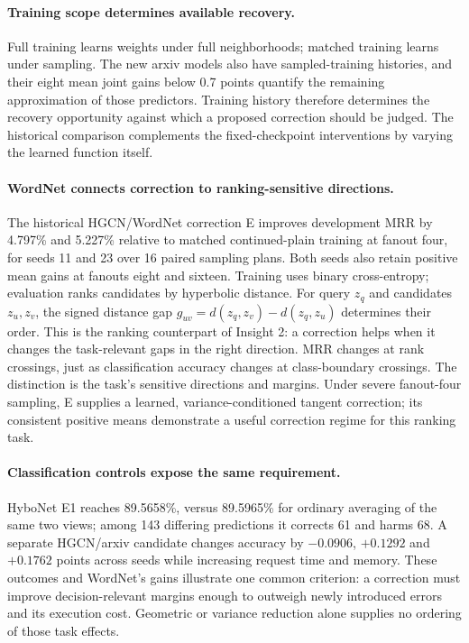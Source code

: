 \documentclass[sigconf, nonacm]{acmart}
\begin{document}
\paragraph{Training scope determines available recovery.}
Full training learns weights under full neighborhoods; matched training learns under sampling. The new arxiv models also have sampled-training histories, and their eight mean joint gains below 0.7 points quantify the remaining approximation of those predictors. Training history therefore determines the recovery opportunity against which a proposed correction should be judged. The historical comparison complements the fixed-checkpoint interventions by varying the learned function itself.

\paragraph{WordNet connects correction to ranking-sensitive directions.}
The historical HGCN/WordNet correction E improves development MRR by 4.797\% and 5.227\% relative to matched continued-plain training at fanout four, for seeds 11 and 23 over 16 paired sampling plans. Both seeds also retain positive mean gains at fanouts eight and sixteen. Training uses binary cross-entropy; evaluation ranks candidates by hyperbolic distance. For query $z_q$ and candidates $z_u,z_v$, the signed distance gap $g_{uv}=d(z_q,z_v)-d(z_q,z_u)$ determines their order. This is the ranking counterpart of Insight 2: a correction helps when it changes the task-relevant gaps in the right direction. MRR changes at rank crossings, just as classification accuracy changes at class-boundary crossings. The distinction is the task's sensitive directions and margins. Under severe fanout-four sampling, E supplies a learned, variance-conditioned tangent correction; its consistent positive means demonstrate a useful correction regime for this ranking task.

\paragraph{Classification controls expose the same requirement.}
HyboNet E1 reaches 89.5658\%, versus 89.5965\% for ordinary averaging of the same two views; among 143 differing predictions it corrects 61 and harms 68. A separate HGCN/arxiv candidate changes accuracy by $-0.0906$, $+0.1292$ and $+0.1762$ points across seeds while increasing request time and memory. These outcomes and WordNet's gains illustrate one common criterion: a correction must improve decision-relevant margins enough to outweigh newly introduced errors and its execution cost. Geometric or variance reduction alone supplies no ordering of those task effects.
\end{document}
